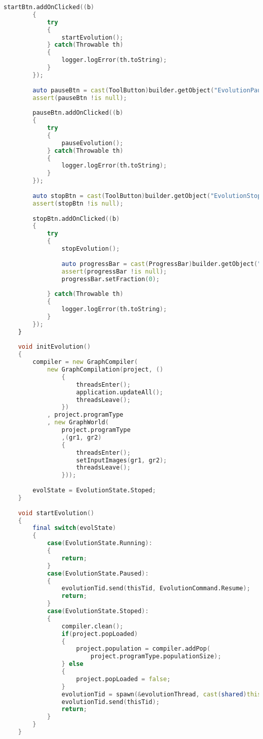 \documentclass[russian,utf8,emptystyle]{eskdtext}
\begin{document}
\begin{lstlisting}[language=D]
        startBtn.addOnClicked((b)
        {
            try 
            {
                startEvolution();
            } catch(Throwable th)
            {
                logger.logError(th.toString);
            }
        });
        
        auto pauseBtn = cast(ToolButton)builder.getObject("EvolutionPauseButton");
        assert(pauseBtn !is null);
        
        pauseBtn.addOnClicked((b)
        {
            try
            {
                pauseEvolution();
            } catch(Throwable th)
            {
                logger.logError(th.toString);
            }
        });
        
        auto stopBtn = cast(ToolButton)builder.getObject("EvolutionStopButton");
        assert(stopBtn !is null);
        
        stopBtn.addOnClicked((b)
        {
            try
            {
                stopEvolution();
                
                auto progressBar = cast(ProgressBar)builder.getObject("EvolutionProgressBar");
                assert(progressBar !is null);
                progressBar.setFraction(0);
                
            } catch(Throwable th)
            {
                logger.logError(th.toString);
            }
        });
    }
    
    void initEvolution()
    {
        compiler = new GraphCompiler(
        	new GraphCompilation(project, ()
        		{
        			threadsEnter();
        			application.updateAll();
        			threadsLeave();
    			})
        	, project.programType
        	, new GraphWorld(
                project.programType
                ,(gr1, gr2)
                {
                    threadsEnter();
                    setInputImages(gr1, gr2);
                    threadsLeave();
                }));
        
        evolState = EvolutionState.Stoped;
    }
    
    void startEvolution()
    {
        final switch(evolState)
        {
            case(EvolutionState.Running):
            {
                return;
            }
            case(EvolutionState.Paused):
            {
                evolutionTid.send(thisTid, EvolutionCommand.Resume);
                return;
            }
            case(EvolutionState.Stoped):
            {
                compiler.clean();
                if(project.popLoaded)
                {
                    project.population = compiler.addPop(
                    	project.programType.populationSize);
                } else
                {
                    project.popLoaded = false;
                }
                evolutionTid = spawn(&evolutionThread, cast(shared)this);
                evolutionTid.send(thisTid);
                return;
            }
        }
    }
    

\end{lstlisting}
\end{document}
